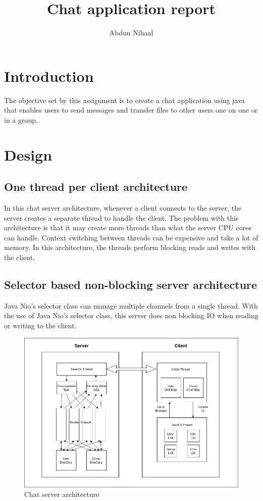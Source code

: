 \documentclass{article}
\title{Chat application report}
\author{Abdun Nihaal}
\begin{document}
\maketitle

\section{Introduction}

The objective set by this assignment is to create a chat application using java that enables users to send messages and transfer files to other users one on one or in a group.

\section{Design}

\subsection{One thread per client architecture}

In this chat server architecture, whenever a client connects to the server, the server creates a separate thread to handle the client.
The problem with this architecture is that it may create more threads than what the server CPU cores can handle.
Context switching between threads can be expensive and take a lot of memory.
In this architecture, the threads perform blocking reads and writes with the client.

\subsection{Selector based non-blocking server architecture}

Java Nio's selector class can manage multiple channels from a single thread. 
With the use of Java Nio's selector class, this server does non blocking IO when reading or writing to the client.

\begin{figure}
	\includegraphics[width=\linewidth]{architecture.png}
	\caption{Chat server architecture}
	\label{fig:architecture}
\end{figure}
\end{document}
